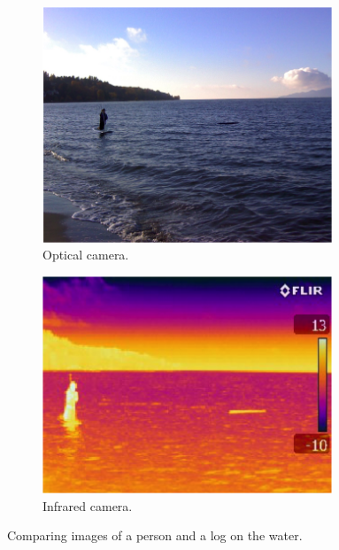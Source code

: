 \begin{figure}
\centering
\begin{subfigure}{0.45\textwidth}
 \centering
 \includegraphics[width=0.95\textwidth]{"./image/person_normal"}
 \caption{Optical camera.}
 \label{fig:person_ex:sub1}
\end{subfigure}
\begin{subfigure}{0.45\textwidth}
 \centering
 \includegraphics[width=0.95\textwidth]{"./image/person_ir"}
 \caption{Infrared camera.}
 \label{fig:person_ex:sub2}
\end{subfigure}
\caption{Comparing images of a person and a log on the water.}
\label{fig:person_ex}
\end{figure}

